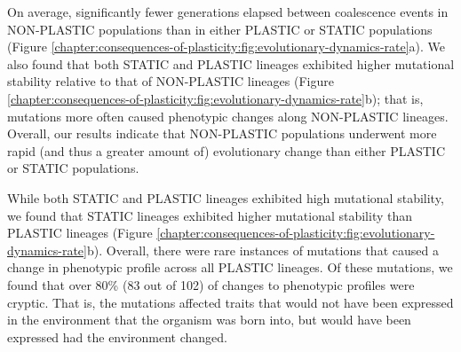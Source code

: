 

On average, significantly fewer generations elapsed between coalescence events in NON-PLASTIC populations than in either PLASTIC or STATIC populations (Figure \ref{chapter:consequences-of-plasticity:fig:evolutionary-dynamics-rate}a).
We also found that both STATIC and PLASTIC lineages exhibited higher mutational stability relative to that of NON-PLASTIC lineages (Figure \ref{chapter:consequences-of-plasticity:fig:evolutionary-dynamics-rate}b); that is, mutations more often caused phenotypic changes along NON-PLASTIC lineages. 
Overall, our results indicate that NON-PLASTIC populations underwent more rapid (and thus a greater amount of) evolutionary change than either PLASTIC or STATIC populations. 

While both STATIC and PLASTIC lineages exhibited high mutational stability, we found that STATIC lineages exhibited higher mutational stability than PLASTIC lineages (Figure \ref{chapter:consequences-of-plasticity:fig:evolutionary-dynamics-rate}b). 
Overall, there were rare instances of mutations that caused a change in phenotypic profile across all PLASTIC lineages.
Of these mutations, we found that over 80\% (83 out of 102) of changes to phenotypic profiles were cryptic. 
That is, the mutations affected traits that would not have been expressed in the environment that the organism was born into, but would have been expressed had the environment changed.




